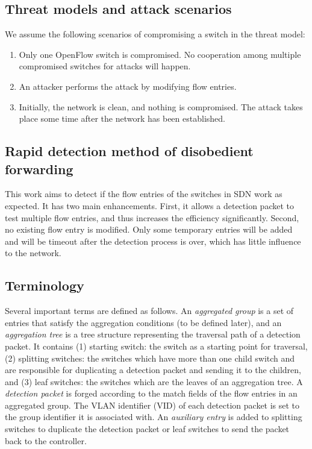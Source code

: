 \documentclass[conference]{IEEEtran}
\begin{document}
\subsection{Threat models and attack scenarios}
We assume the following scenarios of compromising a switch in the threat model:
\begin{enumerate}
\item
Only one OpenFlow switch is compromised. No cooperation among multiple compromised switches for attacks will happen.
\item
An attacker performs the attack by modifying flow entries.
\item
Initially, the network is clean, and nothing is compromised. The attack takes place some time after the network has been established.
\end{enumerate}

\subsection{Rapid detection method of disobedient forwarding}
This work aims to detect if the flow entries of the switches in SDN work as expected. It has two main enhancements. First, it allows a detection packet to test multiple flow entries, and thus increases the efficiency significantly. Second, no existing flow entry is modified. Only some temporary entries will be added and will be timeout after the detection process is over, which has little influence to the network. 

\subsection{Terminology}
Several important terms are defined as follows. An \textit{aggregated group} is a set of entries that satisfy the aggregation conditions (to be defined later), and an \textit{aggregation tree} is a tree structure representing the traversal path of a detection packet. It contains (1) starting switch: the switch as a starting point for traversal, (2) splitting switches: the switches which have more than one child switch and are responsible for duplicating a detection packet and sending it to the children, and (3) leaf switches: the switches which are the leaves of an aggregation tree. A \textit{detection packet} is forged according to the match fields of the flow entries in an aggregated group. The VLAN identifier (VID) of each detection packet is set to the group identifier it is associated with. An \textit{auxiliary entry} is added to splitting switches to duplicate the detection packet or leaf switches to send the packet back to the controller.
\end{document}

